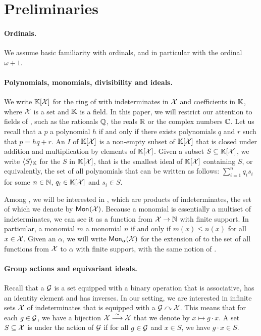 \section{Preliminaries}
\label{sec:preliminaries}

\paragraph{Ordinals.} We assume basic familiarity with ordinals, and in
particular with the ordinal $\omega+1$.  

\paragraph{Polynomials, monomials, divisibility and ideals.} We write
$\poly{\K}{\X}$ for the ring of  with indeterminates in $\X$
and coefficients in $\K$, where $\X$ is a set and $\K$ is a field. In this
paper, we will restrict our attention to fields of ,
such as the rationals $\Q$, the reals $\R$ or the complex numbers $\C$. Let us
recall that a  $p$  a polynomial $h$ if and only
if there exists polynomials $q$ and $r$ such that $p = h q + r$. An
 $I$ of $\poly{\K}{\X}$ is a non-empty subset of $\poly{\K}{\X}$
that is closed under addition and multiplication by elements of
$\poly{\K}{\X}$. Given a subset $S \subseteq \poly{\K}{\X}$, we write
$\gen{S}{\K}$ for the  $S$ in $\poly{\K}{\X}$, that
is the smallest ideal of $\poly{\K}{\X}$ containing $S$, or equivalently, the
set of all polynomials that can be written as follows: $\,\sum_{i=1}^n q_i s_i$ for some
$n \in \N$, $q_i \in \poly{\K}{\X}$ and $s_i \in S$.


Among , we will be interested in , which are
products of indeterminates, the set of which we denote by $\mon{\X}$. Because a
monomial is essentially a multiset of indeterminates, we can see it as a
function from $\X \to \N$ with finite support. In particular, a monomial $m$
 a monomial $n$ if and only if $m(x) \leq n(x)$ for all $x \in \X$.
Given an  $\alpha$, we will write $\mon[\alpha]{\X}$ for the
extension of  to the set of all functions from $\X$ to $\alpha$
with finite support, with the same notion of .


\paragraph{Group actions and equivariant ideals.} Recall that a 
$\group$ is a set equipped with a binary operation that is associative, has an
identity element and has inverses. In our setting, we are interested in
infinite sets $\X$ of indeterminates that is equipped with a  $\group \curvearrowright \X$. This means that for each $g \in \group$,
we have a bijection $\X \tobij \X$ that we denote by $x \mapsto g \cdot x$. A
set $S \subseteq \X$ is  under the action of $\group$ if for
all $g \in \group$ and $x \in S$, we have $g \cdot x \in S$.

